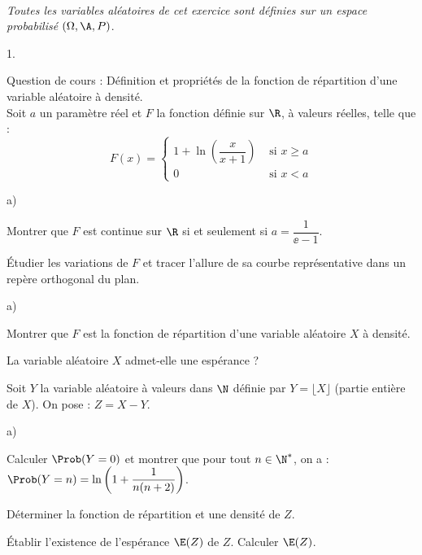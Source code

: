 \documentclass[11pt]{article}%
\begin{document}
\begin{exerciceAP}~\\
  {\it Toutes les variables aléatoires de cet exercice sont définies
    sur un espace probabilisé $(\Omega,\A,P)$}.
  \begin{noliste}{1.}
    \setlength{\itemsep}{2mm}
  \item Question de cours : Définition et propriétés de la fonction de
    répartition d'une variable aléatoire à densité.\\
    Soit $a$ un paramètre réel et $F$ la fonction définie sur $\R$, à
    valeurs réelles, telle que :
    \[
    F(x)=\left\{
      \begin{array}{cl}
        1+\ln\left(\dfrac{x}{x+1}\right) & \mbox{ si $x\geq a$}\\
        0 & \mbox{ si $x<a$}
      \end{array}
    \right.
    \]
  \item 
    \begin{noliste}{a)}
    \setlength{\itemsep}{2mm}
    \item Montrer que $F$ est continue sur $\R$ si et seulement si
      $a=\dfrac{1}{\ee -1}$.

    \item Étudier les variations de $F$ et tracer l'allure de sa
      courbe représentative dans un repère orthogonal du plan.
    \end{noliste}

  \item
    \begin{noliste}{a)}
    \setlength{\itemsep}{2mm}
    \item Montrer que $F$ est la fonction de répartition d'une
      variable aléatoire $X$ à densité.
    \item La variable aléatoire $X$ admet-elle une espérance ?
    \end{noliste}

  \item Soit $Y$ la variable aléatoire à valeurs dans $\N$ définie par
    $Y=\lfloor X\rfloor$ (partie entière de $X$). On pose : $Z=X-Y$.
    \begin{noliste}{a)}
    \setlength{\itemsep}{2mm}
  \item Calculer $\Prob(Y=0)$ et montrer que pour tout $n\in\N^*$, on
    a : $\Prob(Y=n) = \ln\left(1 + \dfrac{1}{n(n + 2)}\right)$.
    \item Déterminer la fonction de répartition et une densité de $Z$.
    \item Établir l'existence de l'espérance $\E(Z)$ de $Z$. Calculer
      $\E(Z)$.
    \end{noliste}
  \end{noliste}
\end{exerciceAP}
\end{document}
